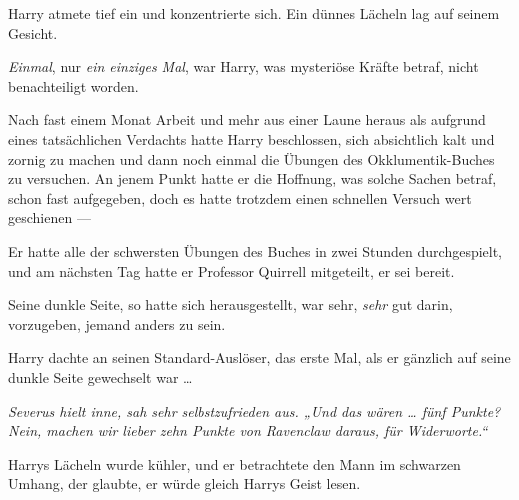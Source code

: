 Harry atmete tief ein und konzentrierte sich. Ein dünnes Lächeln lag auf seinem Gesicht.

\emph{Einmal}, nur \emph{ein einziges Mal}, war Harry, was mysteriöse Kräfte betraf, nicht benachteiligt worden.

Nach fast einem Monat Arbeit und mehr aus einer Laune heraus als aufgrund eines tatsächlichen Verdachts hatte Harry beschlossen, sich absichtlich kalt und zornig zu machen und dann noch einmal die Übungen des Okklumentik-Buches zu versuchen. An jenem Punkt hatte er die Hoffnung, was solche Sachen betraf, schon fast aufgegeben, doch es hatte trotzdem einen schnellen Versuch wert geschienen —

Er hatte alle der schwersten Übungen des Buches in zwei Stunden durchgespielt, und am nächsten Tag hatte er Professor Quirrell mitgeteilt, er sei bereit.

Seine dunkle Seite, so hatte sich herausgestellt, war sehr, \emph{sehr} gut darin, vorzugeben, jemand anders zu sein.

Harry dachte an seinen Standard-Auslöser, das erste Mal, als er gänzlich auf seine dunkle Seite gewechselt war …

\emph{Severus hielt inne, sah sehr selbstzufrieden aus.
„Und das wären … fünf Punkte? Nein, machen wir lieber zehn Punkte von Ravenclaw daraus, für Widerworte.“}

Harrys Lächeln wurde kühler, und er betrachtete den Mann im schwarzen Umhang, der glaubte, er würde gleich Harrys Geist lesen.

